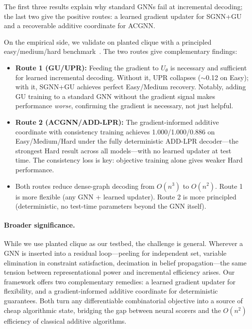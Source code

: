 \documentclass[11pt]{article}
\newcommand{\change}[1]{{\color{red}#1}}
\theoremstyle{plain}
\theoremstyle{definition}
\theoremstyle{remark}
\begin{document}
\medskip
\noindent The first three results explain why standard GNNs fail at incremental
decoding; the last two give the positive routes: a learned gradient updater for
SGNN+GU and a recoverable additive coordinate for ACGNN.

\medskip
On the empirical side, we validate on planted clique with a principled
easy/medium/hard benchmark~\citep{shoham2026ltr}. The two routes give complementary
findings:

\begin{itemize}
  \item \change{\textbf{Route 1 (GU/UPR):} Feeding the gradient to $U_\theta$ is
      necessary and sufficient for learned incremental decoding. Without it, UPR
      collapses ($\sim$0.12 on Easy); with it, SGNN+GU achieves perfect
      Easy/Medium recovery. Notably, adding GU training to a standard GNN without the
      gradient signal makes performance \emph{worse}, confirming the gradient is
    necessary, not just helpful.}
  \item \change{\textbf{Route 2 (ACGNN/ADD-LPR):} The gradient-informed additive
      coordinate with consistency training achieves 1.000/1.000/0.886 on Easy/Medium/Hard
      under the fully deterministic ADD-LPR decoder---the strongest Hard result
      across all models---with no learned updater at test time. The consistency loss
    is key: objective training alone gives weaker Hard performance.}
  \item \change{Both routes reduce dense-graph decoding from $O(n^3)$ to $O(n^2)$.
      Route 1 is more flexible (any GNN + learned updater). Route 2 is more
    principled (deterministic, no test-time parameters beyond the GNN itself).}
\end{itemize}

\paragraph{Broader significance.}
While we use planted clique as our testbed, the challenge is general. Wherever a GNN
is inserted into a residual loop---peeling for independent set, variable elimination
in constraint satisfaction, decimation in belief propagation---the same tension
between representational power and incremental efficiency arises. \change{Our
  framework offers two complementary remedies: a learned gradient updater for
flexibility, and a gradient-informed additive coordinate for deterministic guarantees. Both} turn
any differentiable combinatorial objective into a source of cheap algorithmic state,
bridging the gap between neural scorers and the $O(n^2)$ efficiency of classical
additive algorithms.
\end{document}
